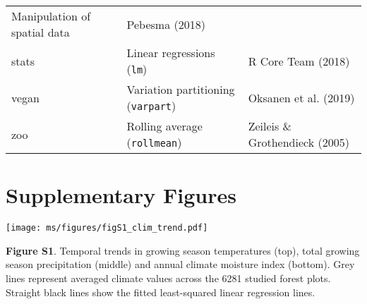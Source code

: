 \documentclass[
]{article}
\begin{document}
\begin{longtable}[]{@{}lll@{}}
\begin{minipage}[t]{0.48\columnwidth}
Manipulation of spatial data\strut
\end{minipage} & \begin{minipage}[t]{0.29\columnwidth}\raggedright
Pebesma (2018)\strut
\end{minipage}\tabularnewline
\begin{minipage}[t]{0.15\columnwidth}\raggedright
stats\strut
\end{minipage} & \begin{minipage}[t]{0.48\columnwidth}\raggedright
Linear regressions (\texttt{lm})\strut
\end{minipage} & \begin{minipage}[t]{0.29\columnwidth}\raggedright
R Core Team (2018)\strut
\end{minipage}\tabularnewline
\begin{minipage}[t]{0.15\columnwidth}\raggedright
vegan\strut
\end{minipage} & \begin{minipage}[t]{0.48\columnwidth}\raggedright
Variation partitioning (\texttt{varpart})\strut
\end{minipage} & \begin{minipage}[t]{0.29\columnwidth}\raggedright
Oksanen et al. (2019)\strut
\end{minipage}\tabularnewline
\begin{minipage}[t]{0.15\columnwidth}\raggedright
zoo\strut
\end{minipage} & \begin{minipage}[t]{0.48\columnwidth}\raggedright
Rolling average (\texttt{rollmean})\strut
\end{minipage} & \begin{minipage}[t]{0.29\columnwidth}\raggedright
Zeileis \& Grothendieck (2005)\strut
\end{minipage}\tabularnewline
\bottomrule
\end{longtable}

\hypertarget{supplementary-figures}{%
\section{Supplementary Figures}\label{supplementary-figures}}

\texttt{[image: ms/figures/figS1\_clim\_trend.pdf]}

\textbf{Figure S1}. Temporal trends in growing season temperatures
(top), total growing season precipitation (middle) and annual climate
moisture index (bottom). Grey lines represent averaged climate values
across the 6281 studied forest plots. Straight black lines show the
fitted least-squared linear regression lines.
\end{document}
